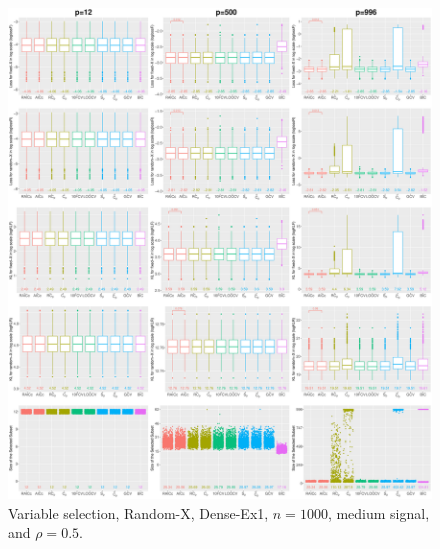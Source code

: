\begin{figure}[!ht]
\centering
\includegraphics[width=\textwidth]{figures/supplement/randomx/subset_selection/Dense-Ex1_n1000_msnr_rho05.eps}
\caption{Variable selection, Random-X, Dense-Ex1, $n=1000$, medium signal, and $\rho=0.5$.}
\end{figure}
\clearpage
